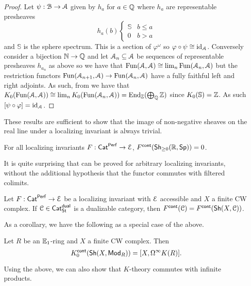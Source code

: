 \begin{proof}
    Let $\psi:\EuScript{B}\to\EuScript{A}$ given by $h_{a}$ for $a\in\mathbb{Q}$ where $h_{a}$ are representable presheaves
    $$h_{a}(b)\begin{cases}
        \mathbb{S} & b\leq a \\
        0 & b>a
    \end{cases}$$
    and $\mathbb{S}$ is the sphere spectrum. This is a section of $\varphi^{\omega}$ so $\varphi\circ\psi\cong\mathrm{id}_{\EuScript{A}}$. Conversely consider a bijection $\mathbb{N}\to\mathbb{Q}$ and let $\EuScript{A}_{n}\subseteq\EuScript{A}$ be sequences of representable presheaves $h_{a_{n}}$ as above so we have that $\mathrm{Fun}(\EuScript{A},\EuScript{A})\cong\lim_{n}\mathrm{Fun}(\EuScript{A}_{n},\EuScript{A})$ but the restriction functors $\mathrm{Fun}(\EuScript{A}_{n+1},\EuScript{A})\to\mathrm{Fun}(\EuScript{A}_{n},\EuScript{A})$ have a fully faithful left and right adjoints. As such, from  we have that $K_{0}(\mathrm{Fun}(\EuScript{A},\EuScript{A}))\cong\lim_{n}K_{0}(\mathrm{Fun}(\EuScript{A}_{n},\EuScript{A}))=\mathrm{End}_{\mathbb{Z}}(\bigoplus_{\mathbb{Q}}\mathbb{Z})$ since $K_{0}(\mathbb{S})=\mathbb{Z}$. As such $[\psi\circ\varphi]=\mathrm{id}_{\EuScript{A}}$.
\end{proof}
These results are sufficient to show that the image of non-negative sheaves on the real line under a localizing invariant is always trivial. 
\begin{theorem}\label{thm: trivial image of non-negative sheaves on the real line}
    For all localizing invariants $F:\mathsf{Cat}^{\mathsf{Perf}}\to\EuScript{E}$, $F^{\mathsf{cont}}(\mathsf{Sh}_{\geq0}(\mathbb{R},\mathsf{Sp}))=0$. 
\end{theorem}
\begin{remark}
    It is quite surprising that  can be proved for arbitrary localizing invariants, without the additional hypothesis that the functor commutes with filtered colimits. 
\end{remark}
\begin{theorem}
    Let $F:\mathsf{Cat}^{\mathsf{Perf}}\to\EuScript{E}$ be a localizing invariant with $\EuScript{E}$ accessible and $X$ a finite CW complex. If $\EuScript{C}\in\mathsf{Cat}^{\mathsf{dual}}_{\mathsf{St}}$ is a dualizable category, then $F^{\mathsf{cont}}(\EuScript{C})=F^{\mathsf{cont}}(\mathsf{Sh}(X,\EuScript{C}))$. 
\end{theorem}

As a corollary, we have the following as a special case of the above. 
\begin{corollary}
    Let $R$ be an $\mathbb{E}_{1}$-ring and $X$ a finite CW complex. Then $$K_{0}^{\mathsf{cont}}(\mathsf{Sh}(X,\mathsf{Mod}_{R}))=[X,\Omega^{\infty}K(R)].$$
\end{corollary}
Using the above, we can also show that $K$-theory commutes with infinite products. 

